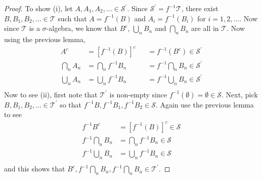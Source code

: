 \begin{proof}
To show (i), let $A,A_1,A_2,\dots \in \mathcal{S}^\prime$.  Since
$\mathcal{S}^\prime = f^{-1}\mathcal{T}$, there exist $B,B_1,B_2,\dots
\in \mathcal{T}$ such that $A = f^{-1}(B)$ and $A_i = f^{-1}(B_i)$ for
$i=1,2,\dots$.  Now since $\mathcal{T}$ is a $\sigma$-algebra, we know
that $B^c$, $\bigcup_n B_n$ and $\bigcap_n B_n$ are all in
$\mathcal{T}$.  Now using the previous lemma,
\begin{align*}
A^c &= \left[f^{-1}(B)\right]^c &&= f^{-1}(B^c) \in
\mathcal{S}^\prime\\
\bigcap_n A_n &= \bigcap_n f^{-1}B_n &&= f^{-1} \bigcap_n B_n \in
\mathcal{S}^\prime \\
\bigcup_n A_n &= \bigcup_n f^{-1}B_n &&= f^{-1} \bigcup_n B_n \in
\mathcal{S}^\prime \\
\end{align*}
Now to see (ii), first note that $\mathcal{T}^\prime$ is non-empty
since $f^{-1} (\emptyset) = \emptyset \in \mathcal{S}$.  Next, pick $B,B_1,B_2,\dots \in \mathcal{T}^\prime$ so that
$f^{-1}B,f^{-1}B_1,f^{-1}B_2 \in \mathcal{S}$.  Again use the previous
lemma to see
\begin{align*}
f^{-1} B^c &= \left[f^{-1}(B)\right]^c \in
\mathcal{S}\\
f^{-1} \bigcap_n B_n &= \bigcap_n f^{-1}B_n \in
\mathcal{S} \\
f^{-1} \bigcup_n B_n &= \bigcup_n f^{-1}B_n \in
\mathcal{S} \\
\end{align*}
and this shows that $B^c,f^{-1} \bigcap_n B_n, f^{-1} \bigcap_n B_n
\in \mathcal{T}^\prime$.
\end{proof}

